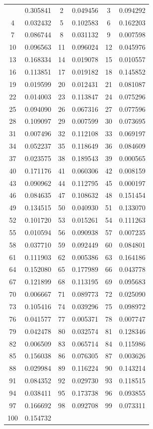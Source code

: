\documentclass[12pt]{article}
\begin{document}
\begin{longtable}{@{}cc|cc|cc@{}}
\bottomrule
\endlastfoot
1 & 0.305841 & 2 & 0.049456 & 3 & 0.094292 \\
4 & 0.032432 & 5 & 0.102583 & 6 & 0.162203 \\
7 & 0.086744 & 8 & 0.031132 & 9 & 0.007598 \\
10 & 0.096563 & 11 & 0.096024 & 12 & 0.045976 \\
13 & 0.168334 & 14 & 0.019078 & 15 & 0.010557 \\
16 & 0.113851 & 17 & 0.019182 & 18 & 0.145852 \\
19 & 0.019599 & 20 & 0.012431 & 21 & 0.081087 \\
22 & 0.014003 & 23 & 0.113847 & 24 & 0.075296 \\
25 & 0.094090 & 26 & 0.067316 & 27 & 0.077596 \\
28 & 0.109097 & 29 & 0.007599 & 30 & 0.073695 \\
31 & 0.007496 & 32 & 0.112108 & 33 & 0.069197 \\
34 & 0.052237 & 35 & 0.118649 & 36 & 0.084609 \\
37 & 0.023575 & 38 & 0.189543 & 39 & 0.000565 \\
40 & 0.171176 & 41 & 0.060306 & 42 & 0.008159 \\
43 & 0.090962 & 44 & 0.112795 & 45 & 0.000197 \\
46 & 0.084635 & 47 & 0.108632 & 48 & 0.151454 \\
49 & 0.134515 & 50 & 0.040930 & 51 & 0.133070 \\
52 & 0.101720 & 53 & 0.015261 & 54 & 0.111263 \\
55 & 0.010594 & 56 & 0.090938 & 57 & 0.007235 \\
58 & 0.037710 & 59 & 0.092449 & 60 & 0.084801 \\
61 & 0.111903 & 62 & 0.005386 & 63 & 0.164186 \\
64 & 0.152080 & 65 & 0.177989 & 66 & 0.043778 \\
67 & 0.121899 & 68 & 0.113195 & 69 & 0.095683 \\
70 & 0.006667 & 71 & 0.089773 & 72 & 0.025090 \\
73 & 0.105416 & 74 & 0.039296 & 75 & 0.098972 \\
76 & 0.041577 & 77 & 0.005371 & 78 & 0.007747 \\
79 & 0.042478 & 80 & 0.032574 & 81 & 0.128346 \\
82 & 0.006509 & 83 & 0.065714 & 84 & 0.115986 \\
85 & 0.156038 & 86 & 0.076305 & 87 & 0.003626 \\
88 & 0.029984 & 89 & 0.116224 & 90 & 0.143214 \\
91 & 0.084352 & 92 & 0.029730 & 93 & 0.118515 \\
94 & 0.038411 & 95 & 0.173738 & 96 & 0.093855 \\
97 & 0.166692 & 98 & 0.092708 & 99 & 0.073311 \\
100 & 0.154732 &  &  &  &  \\

\end{longtable}
\end{document}
